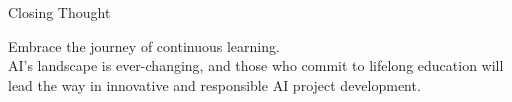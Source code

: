 \documentclass[aspectratio=169]{beamer}
\begin{document}
\begin{frame}{Closing Thought}
    \begin{center}
        Embrace the journey of continuous learning.\\
        AI's landscape is ever-changing, and those who commit to lifelong education will lead the way in innovative and responsible AI project development.
    \end{center}
\end{frame}
\end{document}
